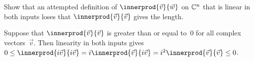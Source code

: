 \begin{exercises}
%
\item
Show that an attempted definition of $\innerprod{\vec{v}}{\vec{w}}$
on $\mathbb{C}^n$ that is linear in both inputs
loses that $\innerprod{\vec{v}}{\vec{v}}$ gives the length.
\begin{answer}
Suppose that
$\innerprod{\vec{v}}{\vec{v}}$ is greater than or equal to~$0$ for all
complex vectors~$\vec{v}$.
Then linearity in both inputs gives
$0\leq \innerprod{i\vec{v}}{i\vec{v}}
  =i\innerprod{\vec{v}}{i\vec{v}}
  =i^2\innerprod{\vec{v}}{\vec{v}}\leq 0$.
\end{answer}





\end{exercises}
\endinput
% 